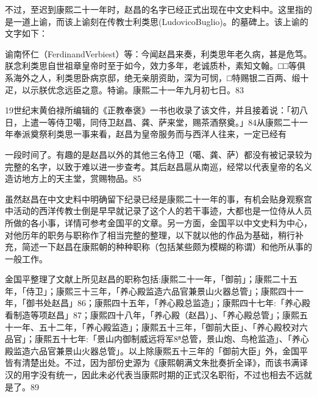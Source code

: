 不过，至迟到康熙二十一年时，赵昌的名字已经正式出现在中文史料中。这里指的是一道上谕，而该上谕刻在传教士利类思(LudovicoBuglio)。的墓碑上。该上谕的文字如下：

\begin{BookQuote}
谕南怀仁（FerdinandVerbiest）等：今闻赵昌来奏，利类思年老久病，甚是危笃。朕念利类思自世祖章皇帝时至于如今，效力多年，老诚质朴，素知文翰。□□等俱系海外之人，利类思卧病京邸，绝无亲朋资助，深为可悯，□特赐银二百两、缎十疋，以示朕优念远臣之意。特谕。康熙二十一年九月初七日。83
\end{BookQuote}

19世纪末黄伯禄所编辑的《正教奉褒》一书也收录了该文件，并且接着说：「初八日，上遣一等侍卫噶，同侍卫赵昌、龚、萨来堂，赐茶酒祭奠。」84从康熙二十一年奉派奠祭利类思一事来看，赵昌为皇帝服务而与西洋人往来，一定已经有

\vfill
\begin{BookNotes}
\end{BookNotes}

\noindent 一段时间了。有趣的是赵昌以外的其他三名侍卫（噶、龚、萨）都没有被记录较为完整的名字，以致于难以进一步查考。其后赵昌扈从南巡，经常以代表皇帝的名义造访地方上的天主堂，赏赐物品。85

虽然赵昌在中文史料中明确留下纪录已经是康熙二十一年的事，有机会贴身观察宫中活动的西洋传教士倒是早早就记录了这个人的若干事迹，大都也是一位侍从人员所做的各小事，详情可参考金国平的文章。另一方面，金国平以中文史料为中心，对他历年的职务与职称作了相当完整的整理，以下就以他的作品为基础，稍行补充，简述一下赵昌在康熙朝的种种职称（包括某些颇为模糊的称谓）和他所从事的一般工作。

金国平整理了文献上所见赵昌的职称包括:康熙二十一年，「御前」；康熙二十五年，「侍卫」；康熙三十三年，「养心殿监造六品官兼景山火器总管」；康熙四十一年，「御书处赵昌」86；康熙四十五年，「养心殿总监造」；康熙四十七年:「养心殿看制造等项赵昌」87；康熙四十八年，「养心殿（赵昌）」、「养心殿总管」；康熙五十一年、五十二年，「养心殿监造」；康熙五十三年，「御前大臣」、「养心殿校对六品官」；康熙五十七年:「景山内御制威远将军8⁸总管，景山炮、鸟枪监造」、「养心殿监造六品官兼景山火器总管」。以上除康熙五十三年的「御前大臣」外，金国平皆有清楚出处。不过，因为部份史源为《康熙朝满文朱批奏折全译》，而该书满译汉的用字没有统一，因此未必代表当康熙时期的正式汉名职衔，不过也相去不远就是了。89

